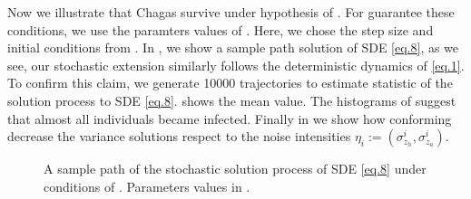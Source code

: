 	Now we illustrate that Chagas survive under hypothesis of 
	. For guarantee these conditions, we use the 
	paramters 
	values  of . 
	Here, we chose the step size 
	and initial conditions from .
	In , we show  a sample path solution of 
	SDE \eqref{eq.8}, as we see, our stochastic extension similarly 
	follows the deterministic dynamics of \eqref{eq.1}. To confirm this claim, 
	we generate \num{10 000} trajectories to estimate statistic of the 
	solution process to SDE \eqref{eq.8}. 
	 shows the mean value. The histograms of 
	 suggest that almost all individuals became
	infected. Finally in  we show how
	conforming decrease the variance solutions 
	respect to the noise intensities 
	$\eta_i:=(\sigma_{z_h}^i ,\sigma_{z_a}^i)$.
	

\begin{figure}[p]
	\centering
	\caption{
		A sample path of the stochastic solution process
		of SDE \eqref{eq.8} under conditions of .
	Parameters values in 
	.
	}\label{fig:persistence_path}
\end{figure}

